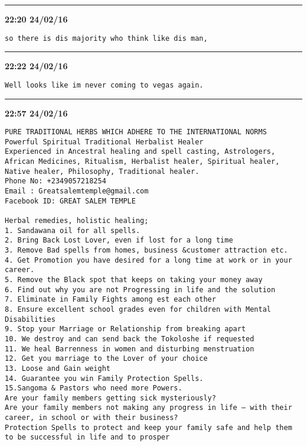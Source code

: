 \hrule%

\begin{adjustwidth}{0cm}{0cm}
\footnotesize \textbf{22:20 24/02/16}

\begin{lstlisting}[breaklines, breakatwhitespace, basicstyle=\small, frame=leftline]
so there is dis majority who think like dis man,
\end{lstlisting}
\end{adjustwidth}

\hrule%

\begin{adjustwidth}{0cm}{0cm}
\footnotesize \textbf{22:22 24/02/16}

\begin{lstlisting}[breaklines, breakatwhitespace, basicstyle=\small, frame=leftline]
Well looks like im never coming to vegas again.
\end{lstlisting}
\end{adjustwidth}

\hrule%

\begin{adjustwidth}{0cm}{0cm}
\footnotesize \textbf{22:57 24/02/16}

\begin{lstlisting}[breaklines, breakatwhitespace, basicstyle=\small, frame=leftline]
PURE TRADITIONAL HERBS WHICH ADHERE TO THE INTERNATIONAL NORMS
Powerful Spiritual Traditional Herbalist Healer
Experienced in Ancestral healing and spell casting, Astrologers, African Medicines, Ritualism, Herbalist healer, Spiritual healer, Native healer, Philosophy, Traditional healer. 
Phone No: +2349057218254
Email : Greatsalemtemple@gmail.com
Facebook ID: GREAT SALEM TEMPLE 

Herbal remedies, holistic healing;
1. Sandawana oil for all spells.
2. Bring Back Lost Lover, even if lost for a long time
3. Remove Bad spells from homes, business &customer attraction etc.
4. Get Promotion you have desired for a long time at work or in your career.
5. Remove the Black spot that keeps on taking your money away
6. Find out why you are not Progressing in life and the solution
7. Eliminate in Family Fights among est each other
8. Ensure excellent school grades even for children with Mental Disabilities
9. Stop your Marriage or Relationship from breaking apart
10. We destroy and can send back the Tokoloshe if requested
11. We heal Barrenness in women and disturbing menstruation
12. Get you marriage to the Lover of your choice
13. Loose and Gain weight
14. Guarantee you win Family Protection Spells.
15.Sangoma & Pastors who need more Powers.
Are your family members getting sick mysteriously?
Are your family members not making any progress in life – with their career, in school or with their business?
Protection Spells to protect and keep your family safe and help them to be successful in life and to prosper
\end{lstlisting}
\end{adjustwidth}

